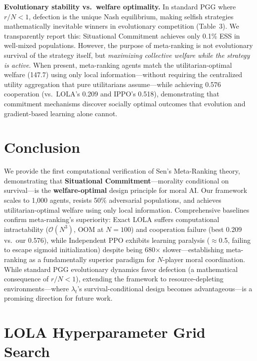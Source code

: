 \documentclass{article}
\begin{document}
\textbf{Evolutionary stability vs.\ welfare optimality.} In standard PGG where $r/N < 1$, defection is the unique Nash equilibrium, making selfish strategies mathematically inevitable winners in evolutionary competition (Table~3). We transparently report this: Situational Commitment achieves only 0.1\% ESS in well-mixed populations. However, the purpose of meta-ranking is not evolutionary survival of the strategy itself, but \textit{maximizing collective welfare while the strategy is active}. When present, meta-ranking agents match the utilitarian-optimal welfare (147.7) using only local information---without requiring the centralized utility aggregation that pure utilitarians assume---while achieving 0.576 cooperation (vs.\ LOLA's 0.209 and IPPO's 0.518), demonstrating that commitment mechanisms discover socially optimal outcomes that evolution and gradient-based learning alone cannot.

\section{Conclusion}

We provide the first computational verification of Sen's Meta-Ranking theory, demonstrating that \textbf{Situational Commitment}---morality conditional on survival---is the \textbf{welfare-optimal} design principle for moral AI. Our framework scales to 1,000 agents, resists 50\% adversarial populations, and achieves utilitarian-optimal welfare using only local information. Comprehensive baselines confirm meta-ranking's superiority: Exact LOLA suffers computational intractability ($\mathcal{O}(N^3)$, OOM at $N{=}100$) and cooperation failure (best 0.209 vs.\ our 0.576), while Independent PPO exhibits learning paralysis ($\approx$0.5, failing to escape sigmoid initialization) despite being 680$\times$ slower---establishing meta-ranking as a fundamentally superior paradigm for $N$-player moral coordination.
While standard PGG evolutionary dynamics favor defection (a mathematical consequence of $r/N < 1$), extending the framework to resource-depleting environments---where $\lambda_t$'s survival-conditional design becomes advantageous---is a promising direction for future work.




\appendix
\section{LOLA Hyperparameter Grid Search}
\label{app:heatmap}
\end{document}
